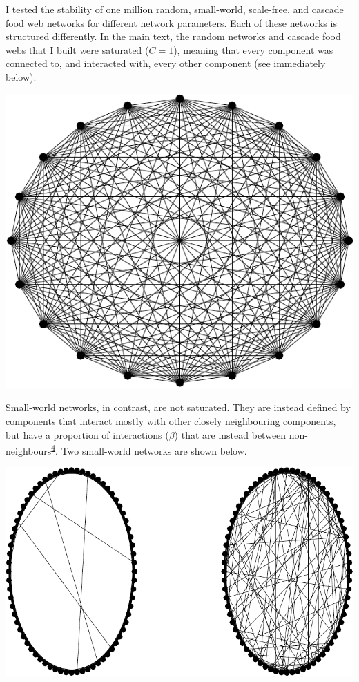 \documentclass[]{article}
\begin{document}
I tested the stability of one million random, small-world, scale-free,
and cascade food web networks for different network parameters. Each of
these networks is structured differently. In the main text, the random
networks and cascade food webs that I built were saturated (\(C = 1\)),
meaning that every component was connected to, and interacted with,
every other component (see immediately below).

\vspace{2mm}

\begin{center}\includegraphics{SI_files/figure-latex/unnamed-chunk-23-1} \end{center}

\vspace{2mm}

Small-world networks, in contrast, are not saturated. They are instead
defined by components that interact mostly with other closely
neighbouring components, but have a proportion of interactions
(\(\beta\)) that are instead between
non-neighbours\textsuperscript{\protect\hyperlink{ref-Watts1998}{4}}.
Two small-world networks are shown below.

\vspace{2mm}

\begin{center}\includegraphics{SI_files/figure-latex/unnamed-chunk-24-1} \end{center}
\end{document}
